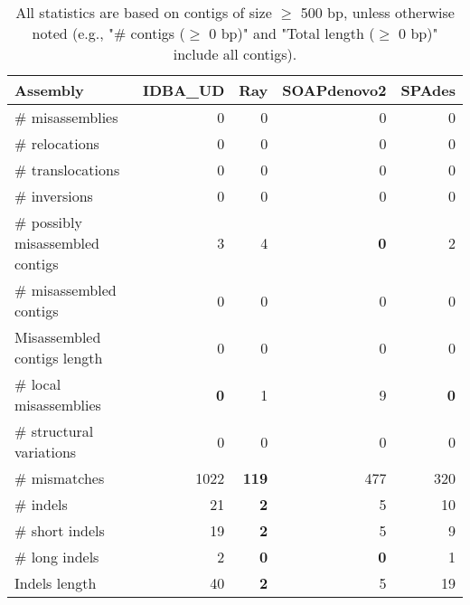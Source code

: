 \documentclass[12pt,a4paper]{article}
\begin{document}
\begin{table}[ht]
\begin{center}
\caption{All statistics are based on contigs of size $\geq$ 500 bp, unless otherwise noted (e.g., "\# contigs ($\geq$ 0 bp)" and "Total length ($\geq$ 0 bp)" include all contigs).}
\begin{tabular}{|l*{4}{|r}|}
\hline
Assembly & IDBA\_UD & Ray & SOAPdenovo2 & SPAdes \\ \hline
\# misassemblies & 0 & 0 & 0 & 0 \\ \hline
\hspace{5mm}\# relocations & 0 & 0 & 0 & 0 \\ \hline
\hspace{5mm}\# translocations & 0 & 0 & 0 & 0 \\ \hline
\hspace{5mm}\# inversions & 0 & 0 & 0 & 0 \\ \hline
\# possibly misassembled contigs & 3 & 4 & {\bf 0} & 2 \\ \hline
\# misassembled contigs & 0 & 0 & 0 & 0 \\ \hline
Misassembled contigs length & 0 & 0 & 0 & 0 \\ \hline
\# local misassemblies & {\bf 0} & 1 & 9 & {\bf 0} \\ \hline
\# structural variations & 0 & 0 & 0 & 0 \\ \hline
\# mismatches & 1022 & {\bf 119} & 477 & 320 \\ \hline
\# indels & 21 & {\bf 2} & 5 & 10 \\ \hline
\hspace{5mm}\# short indels & 19 & {\bf 2} & 5 & 9 \\ \hline
\hspace{5mm}\# long indels & 2 & {\bf 0} & {\bf 0} & 1 \\ \hline
Indels length & 40 & {\bf 2} & 5 & 19 \\ \hline
\end{tabular}
\end{center}
\end{table}
\end{document}
